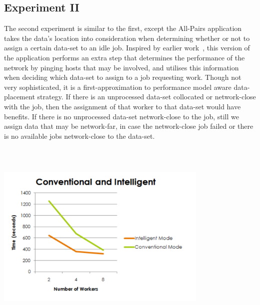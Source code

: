 \documentclass[a4paper,11pt]{article} \pagestyle{empty} \usepackage{amssymb}
\begin{document}
\subsection{Experiment II}
The second experiment is similar to the first, except the All-Pairs application
takes the data's location into consideration when determining whether or not to
assign a certain data-set to an idle job. Inspired by earlier
work~\cite{netperf}, this version of the application performs an extra step
that determines the performance of the network by pinging hosts that may be
involved, and utilises this information when deciding which data-set to assign
to a job requesting work. Though not very sophisticated, it is a
first-approximation to performance model aware data-placement strategy.  If
there is an unprocessed data-set collocated or network-close with the job, then
the assignment of that worker to that data-set would have benefits. If there is
no unprocessed data-set network-close to the job, still we assign data that may
be network-far, in case the network-close job failed or there is no available
jobs network-close to the data-set.
\includegraphics[width=4in,height=4in]{ConventionalIntelligent.pdf}
\end{document}
